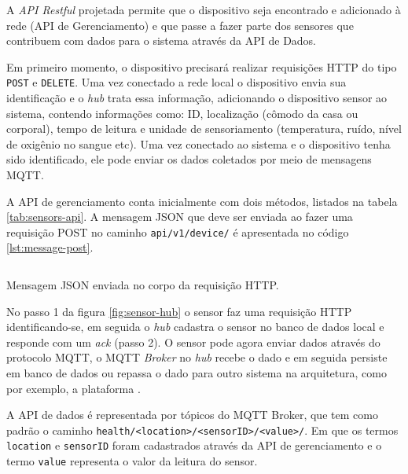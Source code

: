 A \textit{API Restful} projetada permite que o dispositivo seja encontrado e
adicionado à rede (API de Gerenciamento) e que passe a fazer parte dos sensores
que contribuem com dados para o sistema através da API de Dados.


Em primeiro momento, o dispositivo precisará realizar requisições HTTP do tipo
\texttt{POST} e \texttt{DELETE}. Uma vez conectado a rede local o dispositivo envia sua
identificação e o \textit{hub} trata essa informação, adicionando o dispositivo
sensor ao sistema, contendo informações como: ID, localização (cômodo da casa
ou corporal), tempo de leitura e unidade de sensoriamento (temperatura, ruído,
nível de oxigênio no sangue etc). Uma vez conectado ao sistema e o dispositivo
tenha sido identificado, ele pode enviar os dados coletados por meio de
mensagens MQTT. 

A API de gerenciamento conta inicialmente com dois métodos, listados na tabela
\ref{tab:sensors-api}. A mensagem JSON que deve ser enviada ao fazer uma
requisição POST no caminho \texttt{api/v1/device/} é apresentada no código
\ref{lst:message-post}.

\begin{listing}[ht!]
\inputminted{json}{codigos/message-post.json}
\caption{Mensagem JSON enviada no corpo da requisição HTTP.}
\label{lst:message-post}
\end{listing}

No passo 1 da figura \ref{fig:sensor-hub} o sensor faz uma requisição HTTP
identificando-se, em seguida o \textit{hub} cadastra o sensor no banco de dados
local e responde com um \textit{ack} (passo 2). O sensor pode agora enviar
dados através do protocolo MQTT, o MQTT \textit{Broker} no \textit{hub} recebe
o dado e em seguida persiste em banco de dados ou repassa o dado para outro
sistema na arquitetura, como por exemplo, a plataforma \nextsaude.


A API de dados é representada por tópicos do MQTT Broker, que tem como padrão
o caminho \texttt{health/<location>/<sensorID>/<value>/}. Em que os termos 
\texttt{location} e \texttt{sensorID} foram cadastrados através da API de
gerenciamento e o termo \texttt{value} representa o valor da leitura do sensor.
